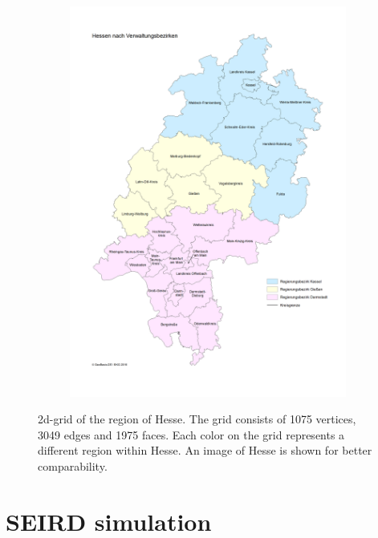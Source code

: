 \begin{figure}
\begin{center}
\begin{subfigure}[b]{0.4\textwidth}
			\includegraphics[width=\textwidth]{./figures/Hessen.png}
		\end{subfigure}
	\end{center}
	\caption{2d-grid of the region of Hesse. The grid consists of 1075 vertices, 3049 edges and 1975 faces.
		Each color on the grid represents a different region within Hesse. An image of Hesse is shown
		for better comparability\cite{HesseImage}.}
	\label{fig:2d-grid}
\end{figure}



\section{SEIRD simulation}

